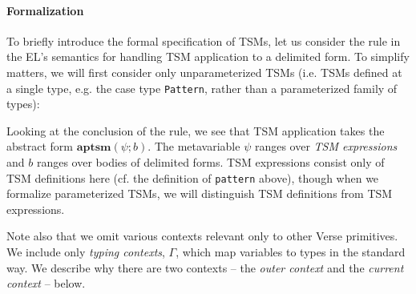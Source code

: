 \paragraph{Formalization} To briefly introduce the formal specification of TSMs, let us consider the rule in the EL's semantics for handling TSM application to a delimited form. To simplify matters, we will first consider only unparameterized TSMs (i.e. TSMs defined at a single type, e.g. the case type \lstinline{Pattern}, rather than a parameterized family of types): 
\begin{mathpar}
\end{mathpar}
Looking at the conclusion of the rule, we see that TSM application takes the abstract form $\mathbf{aptsm}(\psi; b)$. The metavariable $\psi$ ranges over \emph{TSM expressions} and $b$ ranges over {bodies} of delimited forms. TSM expressions consist only of TSM definitions here (cf. the definition of \lstinline{pattern} above), though when we formalize parameterized TSMs, we will distinguish TSM definitions from TSM expressions.%

Note also that we omit various contexts relevant only to other Verse primitives. We include only \emph{typing contexts}, $\Gamma$, which map variables to types in the standard way. We describe why there are two contexts -- the \emph{outer context} and the \emph{current context} -- below. 


